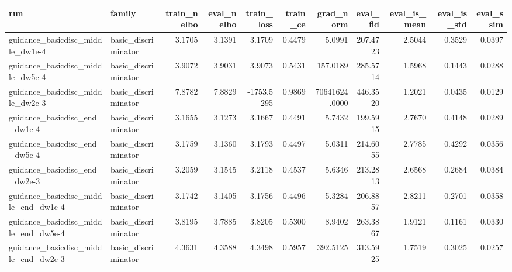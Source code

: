 \begin{tabular}{llrrrrrrrrr}
\toprule
run & family & train_nelbo & eval_nelbo & train_loss & train_ce & grad_norm & eval_fid & eval_is_mean & eval_is_std & eval_ssim \\
\midrule
guidance_basicdisc_middle_dw1e-4 & basic_discriminator & 3.1705 & 3.1391 & 3.1709 & 0.4479 & 5.0991 & 207.4723 & 2.5044 & 0.3529 & 0.0397 \\
guidance_basicdisc_middle_dw5e-4 & basic_discriminator & 3.9072 & 3.9031 & 3.9073 & 0.5431 & 157.0189 & 285.5714 & 1.5968 & 0.1443 & 0.0288 \\
guidance_basicdisc_middle_dw2e-3 & basic_discriminator & 7.8782 & 7.8829 & -1753.5295 & 0.9869 & 70641624.0000 & 446.3520 & 1.2021 & 0.0435 & 0.0129 \\
guidance_basicdisc_end_dw1e-4 & basic_discriminator & 3.1655 & 3.1273 & 3.1667 & 0.4491 & 5.7432 & 199.5915 & 2.7670 & 0.4148 & 0.0289 \\
guidance_basicdisc_end_dw5e-4 & basic_discriminator & 3.1759 & 3.1360 & 3.1793 & 0.4497 & 5.0311 & 214.6055 & 2.7785 & 0.4292 & 0.0356 \\
guidance_basicdisc_end_dw2e-3 & basic_discriminator & 3.2059 & 3.1545 & 3.2118 & 0.4537 & 5.6346 & 213.2813 & 2.6568 & 0.2684 & 0.0384 \\
guidance_basicdisc_middle_end_dw1e-4 & basic_discriminator & 3.1742 & 3.1405 & 3.1756 & 0.4496 & 5.3284 & 206.8857 & 2.8211 & 0.2701 & 0.0358 \\
guidance_basicdisc_middle_end_dw5e-4 & basic_discriminator & 3.8195 & 3.7885 & 3.8205 & 0.5300 & 8.9402 & 263.3867 & 1.9121 & 0.1161 & 0.0330 \\
guidance_basicdisc_middle_end_dw2e-3 & basic_discriminator & 4.3631 & 4.3588 & 4.3498 & 0.5957 & 392.5125 & 313.5925 & 1.7519 & 0.3025 & 0.0257 \\
\bottomrule
\end{tabular}
